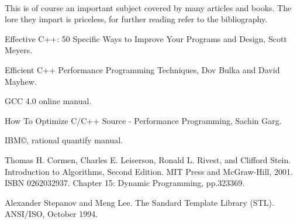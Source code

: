 \documentclass{article}
\begin{document}
 \paragraph{}
 This is of course an important subject covered by many articles and books. 
 The lore they impart is priceless, for further reading refer to the bibliography.

\begin{thebibliography}{}

 Effective C++: 50 Specific Ways to Improve Your Programs and Design, Scott Meyers.

 Efficient C++ Performance Programming Techniques,  Dov Bulka and David Mayhew.

 GCC 4.0 online manual.

 How To Optimize C/C++ Source - Performance Programming,  Sachin Garg.

  IBM\copyright,  rational quantify manual.

 Thomas H. Cormen, Charles E. Leiserson, Ronald L. Rivest, and Clifford Stein. Introduction to Algorithms, Second Edition. MIT Press and McGraw-Hill, 2001. ISBN 0262032937. Chapter 15: Dynamic Programming, pp.323369.

 Alexander Stepanov and Meng Lee.  The Sandard Template Library (STL). ANSI/ISO, October 1994. 

\end{thebibliography}{}
\end{document}
